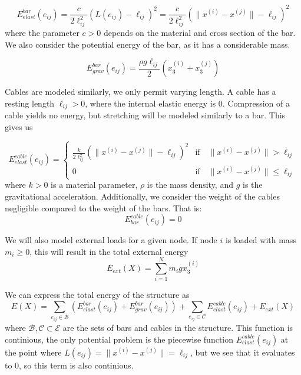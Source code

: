 \documentclass[11pt]{article}
\newcommand{\el}{\ell_{ij}}
\newcommand{\xnorm}{\lVert x^{(i)} - x^{(j)}\rVert}
\newcommand{\e}{(e_{ij})}
\newcommand{\sumset}[1]{\sum\limits_{e_{ij} \in \mathcal{#1}}}
\newcommand{\ebe}{E^{bar}_{elast}(e_{ij})}
\newcommand{\ebg}{E^{bar}_{grav}(e_{ij})}
\newcommand{\ece}{E^{cable}_{elast}(e_{ij})}
\newcommand{\ee}{E_{ext}(X)}
\begin{document}
\begin{equation}
    \ebe = \frac{c}{2\el^2}(L\e - \el)^2 = \frac{c}{2 \el^2}(\xnorm - \el)^2 
    \label{barElast}
\end{equation}
where the parameter $c > 0$ depends on the material and cross section of the bar. We also consider the potential energy of the bar, as it has a considerable mass. 

\begin{equation}
    \ebg = \frac{\rho g \el}{2}(x_3^{(i)}+x_3^{(j)})
    \label{barGrav}
\end{equation}

Cables are modeled similarly, we only permit varying length. A cable has a resting length $\el > 0$, where the internal elastic energy is $0$. Compression of a cable yields no energy, but stretching will be modeled similarly to a bar. This gives us 

\begin{equation}
\ece = \begin{cases}
    \frac{k}{2\el^2}(\xnorm-\el)^2 & \text{if} \quad \xnorm >\el\\
    0 & \text{if} \quad \xnorm \leq \el
    \end{cases}
    \label{cableElast}
\end{equation}
where $k > 0$ is a material parameter, $\rho$ is the mass density, and $g$ is the gravitational acceleration. Additionally, we consider the weight of the cables negligible compared to the weight of the bars. That is: 
\begin{equation}
    E^{cable}_{bar}\e = 0
    \label{cableGrav}
\end{equation}

We will also model external loads for a given node. If node $i$ is loaded with mass $m_i \geq 0$, this will result in the total external energy 
\begin{equation}
    \ee = \sum_{i=1}^{N} m_i g x_3^{(i)}
    \label{externalEnergy}
\end{equation}

We can express the total energy of the structure as \begin{equation}
    E(X) = \sumset{B}(\ebe + \ebg) + \sumset{C} \ece + \ee
    \label{totalEnergy}
\end{equation} where $\mathcal{B}, \mathcal{C} \subset \mathcal{E}$ are the sets of bars and cables in the structure. This function is continious, the only potential problem is the piecewise function $\ece$ at the point where $L\e = \xnorm = \el$, but we see that it evaluates to $0$, so this term is also continious. 
\end{document}
